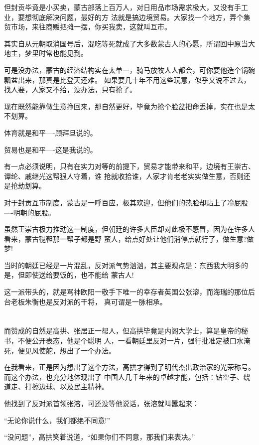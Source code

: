 \documentclass[11pt,a4paper,onecolumn]{article}
\begin{document}
但封贡毕竟是小买卖，蒙古部落上百万人，对日用品市场需求极大，又没有手工业，要想彻底解决问题，最好的方
法就是搞边境贸易。大家找一个地方，弄个集贸市场，来往商贩把摊一摆，你买我卖，这就叫互市。

其实自从元朝取消国号后，混吃等死就成了大多数蒙古人的心愿，所谓回中原当大地主，梦里时常也能见到。

可是没办法，蒙古的经济结构实在太单一，骑马放牧人人都会，可你要他造个锅碗瓢盆出来，那真是比登天还难。
如果要几十年不用这些玩意，似乎又说不过去，找人要，人家又不给，没办法，只有抢了。

现在既然能靠做生意挣回来，那自然更好，毕竟为抢个脸盆把命丢掉，实在也是太不划算。

体育就是和平----顾拜旦说的。

贸易也是和平----这是我说的。

有一点必须说明，只有在实力对等的前提下，贸易才能带来和平，边境有王崇古、谭纶、戚继光这帮狠人守着，谁
抢就收拾谁，人家才肯老老实实做生意，否则还是抢劫划算。

对于封贡互市制度，蒙古是一呼百应，极其欢迎，但他们的热脸却贴上了冷屁股----明朝的屁股。

虽然王崇古极力推动这一制度，但朝廷的许多大臣却对此极不感冒，因为在许多人看来，蒙古鞑靼那一帮子都是野
蛮人，给点好处让他们消停点就行了，做生意?做梦!

当时的朝廷已经是一片混乱，反对派气势汹汹，其主要观点是：东西我大明多的是，但即使送给要饭的，也不能给
蒙古人!

这一派带头的，就是骂神欧阳一敬手下唯一的幸存者英国公张溶，而海瑞的那位后台老板朱衡也是反对派的干将，
真可谓是一脉相承。

\section[\thesection]{}

而赞成的自然是高拱、张居正一帮人，但高拱毕竟是内阁大学士，算是皇帝的秘书，不便公开表态，他是个聪明
人，一看朝廷里反对一片，强行批准定被口水淹死，便见风使舵，想出了一个办法。

在我看来，正是因为想出了这个方法，高拱才得到了明代杰出政治家的光荣称号。而这个办法，也充分地体现出了
中国人几千年来的卓越才能，包括：钻空子、绕道走、打擦边球、以及民主精神。

他找到了反对派首领张溶，可还没等他说话，张溶就叫嚣起来：

``无论你说什么，我们都绝不同意!''

``没问题''，高拱笑着说道，``如果你们不同意，那我们来表决。''
\end{document}
